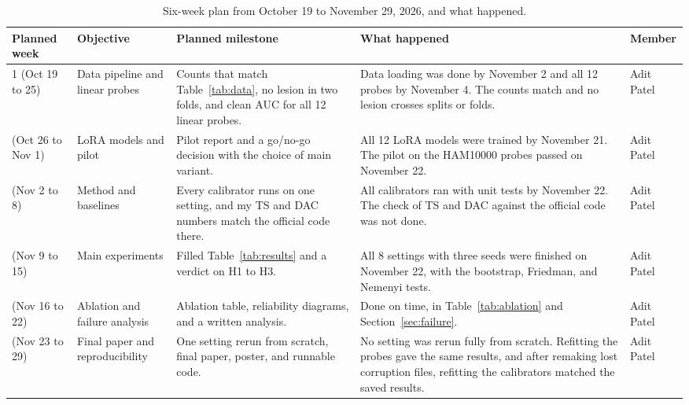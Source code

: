 \documentclass[sigconf,nonacm]{acmart}
\begin{document}
\begin{table}[t]
  \caption{Six-week plan from October 19 to November 29, 2026, and what happened.}
  \label{tab:plan}
  \scriptsize
  \setlength{\tabcolsep}{4pt}
  \renewcommand{\arraystretch}{1.15}
  \begin{tabularx}{\textwidth}{@{}P{1.3cm}P{2.1cm}P{5.2cm}LP{1.15cm}@{}}
    \toprule
    \textbf{Planned week} & \textbf{Objective} & \textbf{Planned milestone} & \textbf{What happened} & \textbf{Member} \\
     (Oct 19 to 25) & Data pipeline and linear probes & Counts that match Table~\ref{tab:data}, no lesion in two folds, and clean AUC for all 12 linear probes. & Data loading was done by November 2 and all 12 probes by November 4. The counts match and no lesion crosses splits or folds. & Adit Patel \\
     (Oct 26 to Nov 1) & LoRA models and pilot & Pilot report and a go/no-go decision with the choice of main variant. & All 12 LoRA models were trained by November 21. The pilot on the HAM10000 probes passed on November 22. & Adit Patel \\
     (Nov 2 to 8) & Method and baselines & Every calibrator runs on one setting, and my TS and DAC numbers match the official code there. & All calibrators ran with unit tests by November 22. The check of TS and DAC against the official code was not done. & Adit Patel \\
     (Nov 9 to 15) & Main experiments & Filled Table~\ref{tab:results} and a verdict on H1 to H3. & All 8 settings with three seeds were finished on November 22, with the bootstrap, Friedman, and Nemenyi tests. & Adit Patel \\
     (Nov 16 to 22) & Ablation and failure analysis & Ablation table, reliability diagrams, and a written analysis. & Done on time, in Table~\ref{tab:ablation} and Section~\ref{sec:failure}. & Adit Patel \\
     (Nov 23 to 29) & Final paper and reproducibility & One setting rerun from scratch, final paper, poster, and runnable code. & No setting was rerun fully from scratch. Refitting the probes gave the same results, and after remaking lost corruption files, refitting the calibrators matched the saved results. & Adit Patel \\
    \bottomrule
  \end{tabularx}
\end{table}
\end{document}
